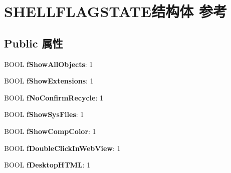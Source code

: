 \hypertarget{struct_s_h_e_l_l_f_l_a_g_s_t_a_t_e}{}\section{S\+H\+E\+L\+L\+F\+L\+A\+G\+S\+T\+A\+T\+E结构体 参考}
\label{struct_s_h_e_l_l_f_l_a_g_s_t_a_t_e}
\subsection*{Public 属性}
\begin{DoxyCompactItemize}
\item 
\mbox{\label{struct_s_h_e_l_l_f_l_a_g_s_t_a_t_e_aeb8460aa75f004386637829a3c6284e6}} 
B\+O\+OL {\bfseries f\+Show\+All\+Objects}\+: 1
\item 
\mbox{\label{struct_s_h_e_l_l_f_l_a_g_s_t_a_t_e_a9a74d8a913bddcb3d662efc7d1ad2026}} 
B\+O\+OL {\bfseries f\+Show\+Extensions}\+: 1
\item 
\mbox{\label{struct_s_h_e_l_l_f_l_a_g_s_t_a_t_e_aa63983414397d9aa55be27c89e14b192}} 
B\+O\+OL {\bfseries f\+No\+Confirm\+Recycle}\+: 1
\item 
\mbox{\label{struct_s_h_e_l_l_f_l_a_g_s_t_a_t_e_ae85698cee5cf0b8d2cecc185f100ad38}} 
B\+O\+OL {\bfseries f\+Show\+Sys\+Files}\+: 1
\item 
\mbox{\label{struct_s_h_e_l_l_f_l_a_g_s_t_a_t_e_a6f41d8358e81af6f7095e9aa6b67f196}} 
B\+O\+OL {\bfseries f\+Show\+Comp\+Color}\+: 1
\item 
\mbox{\label{struct_s_h_e_l_l_f_l_a_g_s_t_a_t_e_a8b60656f165e1785c320d913932a2748}} 
B\+O\+OL {\bfseries f\+Double\+Click\+In\+Web\+View}\+: 1
\item 
\mbox{\label{struct_s_h_e_l_l_f_l_a_g_s_t_a_t_e_a8d028549eedc538c9060996d4cdb62f2}} 
B\+O\+OL {\bfseries f\+Desktop\+H\+T\+ML}\+: 1
\item 
\mbox{\label{struct_s_h_e_l_l_f_l_a_g_s_t_a_t_e_a6f03dbbc1ebd1331b5d639673cf16209}} 

\end{DoxyCompactItemize}
